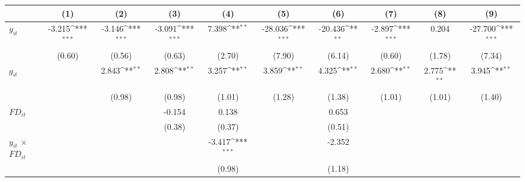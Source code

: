 \documentclass[12pt, a4paper]{article}
\begin{document}
	
	\begin{table}[htbp]
		\centering
		\scriptsize
		\setlength\tabcolsep{1pt}	
		\begin{threeparttable}
			{
				\def\sym#1{\ifmmode^{#1}\else\(^{#1}\)\fi}
				\begin{tabular}{l*{9}{c}}
					\hline\hline
					&\multicolumn{1}{c}{(1)}&\multicolumn{1}{c}{(2)}&\multicolumn{1}{c}{(3)}&\multicolumn{1}{c}{(4)}&\multicolumn{1}{c}{(5)}&\multicolumn{1}{c}{(6)}&\multicolumn{1}{c}{(7)}&\multicolumn{1}{c}{(8)}&\multicolumn{1}{c}{(9)}\\
					\hline
					$y_{it}$               &      -3.215\sym{***}&      -3.146\sym{***}&      -3.091\sym{***}&       7.398\sym{**} &     -28.036\sym{***}&     -20.436\sym{**} &      -2.897\sym{***}&       0.204         &     -27.700\sym{***}\\
					&      (0.60)         &      (0.56)         &      (0.63)         &      (2.70)         &      (7.90)         &      (6.14)         &      (0.60)         &      (1.78)         &      (7.34)         \\
					$g_{it}$              &                     &       2.843\sym{**} &       2.808\sym{**} &       3.257\sym{**} &       3.859\sym{**} &       4.325\sym{**} &       2.680\sym{**} &       2.775\sym{**} &       3.945\sym{**} \\
					&                     &      (0.98)         &      (0.98)         &      (1.01)         &      (1.28)         &      (1.38)         &      (1.01)         &      (1.01)         &      (1.40)         \\
					$FD_{it}$                &                     &                     &      -0.154         &       0.138         &                     &       0.653         &                     &                     &                     \\
					&                     &                     &      (0.38)         &      (0.37)         &                     &      (0.51)         &                     &                     &                     \\
					$y_{it}$ $\times$ $FD_{it}$ &                     &                     &                     &      -3.417\sym{***}&                     &      -2.352         &                     &                     &                     \\
					&                     &                     &                     &      (0.98)         &                     &      (1.18)         &                     &                     &                     \\

\end{tabular}}
\end{threeparttable}
\end{table}
\end{document}
